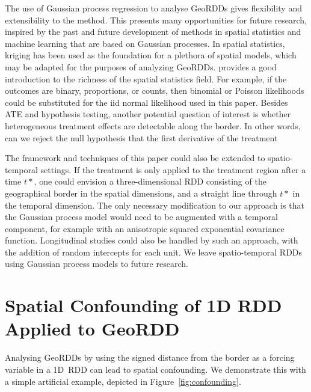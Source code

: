 \documentclass[letter]{article}
\renewcommand{\cite}[1]{\citet{#1}}
\begin{document}
    	The use of Gaussian process regression to analyse GeoRDDs gives flexibility and extensibility to the method.
This presents many opportunities for future research, inspired by the past and future development of methods in spatial statistics and machine learning that are based on Gaussian processes.
In spatial statistics, kriging has been used as the foundation for a plethora of spatial models, which may be adapted for the purposes of analyzing GeoRDDs.
\cite{banerjee2014hierarchical} provides a good introduction to the richness of the spatial statistics field.
For example, if the outcomes are binary, proportions, or counts, then binomial or Poisson likelihoods could be substituted for the iid normal likelihood used in this paper.
Besides ATE and hypothesis testing, another potential question of interest is whether heterogeneous treatment effects are detectable along the border.
In other words, can we reject the null hypothesis that the first derivative of the treatment

The framework and techniques of this paper could also be extended to spatio-temporal settings.
If the treatment is only applied to the treatment region after a time \(t*\), one could envision a three-dimensional RDD consisting of the geographical border in the spatial dimensions, and a straight line through \(t*\) in the temporal dimension.
The only necessary modification to our approach is that the Gaussian process model would need to be augmented with a temporal component, for example with an anisotropic squared exponential covariance function.
Longitudinal studies could also be handled by such an approach, with the addition of random intercepts for each unit.
We leave spatio-temporal RDDs using Gaussian process models to future research.
    


    	\appendix
    


    	\section{Spatial Confounding of 1D RDD Applied to GeoRDD}\label{spatial-confounding-of-1d-rdd-applied-to-geordd}
    


    	\label{sec:confounding}
    


    	Analysing GeoRDDs by using the signed distance from the border as a forcing variable in a 1D~RDD can lead to spatial confounding.
We demonstrate this with a simple artificial example, depicted in Figure~\ref{fig:confounding}.
    
\end{document}
